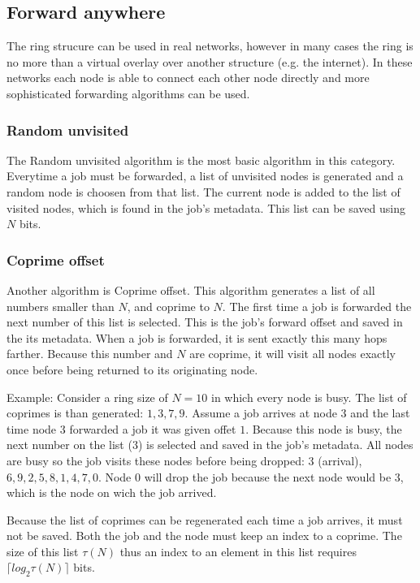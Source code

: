 \documentclass[10pt,a4paper]{article}
\begin{document}
\subsection{Forward anywhere}
The ring strucure can be used in real networks, however in many cases the ring is no more than a virtual overlay over another structure (e.g. the internet). In these networks each node is able to connect each other node directly and more sophisticated forwarding algorithms can be used.

\subsubsection*{Random unvisited}
The Random unvisited algorithm is the most basic algorithm in this category. Everytime a job must be forwarded, a list of unvisited nodes is generated and a random node is choosen from that list. The current node is added to the list of visited nodes, which is found in the job's metadata. This list can be saved using $N$ bits.

\subsubsection*{Coprime offset}
Another algorithm is Coprime offset. This algorithm generates a list of all numbers smaller than $N$, and coprime to $N$. The first time a job is forwarded the next number of this list is selected. This is the job's forward offset and saved in the its metadata. When a job is forwarded, it is sent exactly this many hops farther. Because this number and $N$ are coprime, it will visit all nodes exactly once before being returned to its originating node. 

Example:
Consider a ring size of $N=10$ in which every node is busy. The list of coprimes is than generated: ${1, 3, 7, 9}$. Assume a job arrives at node $3$ and the last time node $3$ forwarded a job it was given offet $1$.
Because this node is busy, the next number on the list ($3$) is selected and saved in the job's metadata. All nodes are busy so the job visits these nodes before being dropped: $3$ (arrival), $6, 9, 2, 5, 8, 1, 4, 7, 0$. Node $0$ will drop the job because the next node would be $3$, which is the node on wich the job arrived.

Because the list of coprimes can be regenerated each time a job arrives, it must not be saved. Both the job and the node must keep an index to a coprime. The size of this list $\tau(N)$ thus an index to an element in this list requires $\lceil log_2 \tau(N) \rceil$ bits.
\end{document}
